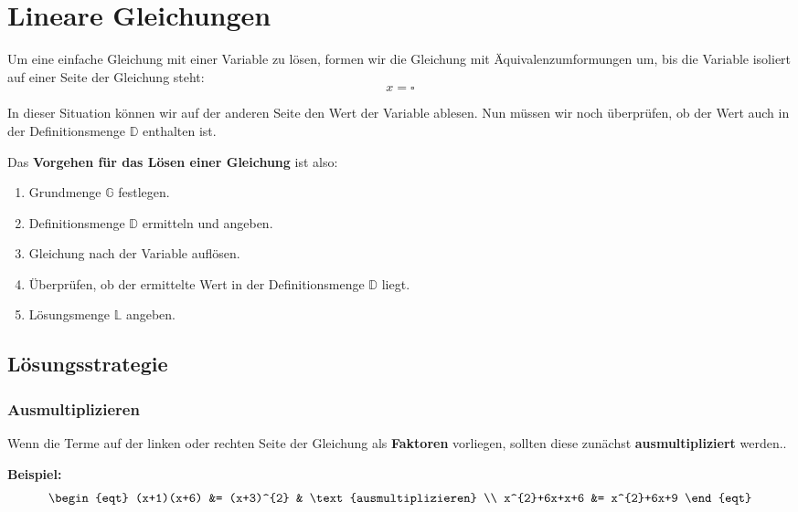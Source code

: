\newpage
\section{Lineare Gleichungen}

Um eine einfache Gleichung mit einer Variable zu lösen, formen wir die Gleichung mit Äquivalenzumformungen um, bis die Variable isoliert auf einer Seite der Gleichung steht:
\[
  x = \square
\]

In dieser Situation können wir auf der anderen Seite den Wert der Variable ablesen. Nun müssen wir noch überprüfen, ob der Wert auch in der Definitionsmenge $\mathbb{D}$ enthalten ist.

\begin{theorem}
  Das \textbf{Vorgehen für das Lösen einer Gleichung} ist also:
  \begin{enumerate}
    \item Grundmenge $\mathbb{G}$ festlegen.
    \item Definitionsmenge $\mathbb{D}$ ermitteln und angeben.
    \item Gleichung nach der Variable auflösen.
    \item Überprüfen, ob der ermittelte Wert in der Definitionsmenge $\mathbb{D}$ liegt.
    \item Lösungsmenge $\mathbb{L}$ angeben.
  \end{enumerate}
\end{theorem}

\subsection{Lösungsstrategie}

\subsubsection{Ausmultiplizieren}

Wenn die Terme auf der linken oder rechten Seite der Gleichung als \textbf{Faktoren} vorliegen, sollten diese zunächst \textbf{ausmultipliziert} werden..

\begin{example}
  \textbf{Beispiel:}
  \[\begin{eqt}
     (x+1)(x+6) &= (x+3)^{2} & \text{ausmultiplizieren} \\
   x^{2}+6x+x+6 &= x^{2}+6x+9
  \end{eqt}\]
\end{example}

